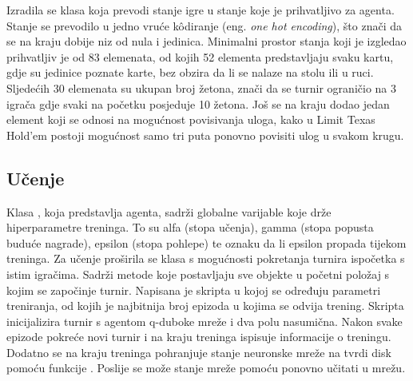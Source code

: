 Izradila se klasa koja prevodi stanje igre u stanje koje je prihvatljivo za agenta. Stanje se prevodilo u jedno vruće k\^odiranje (eng. \textit{one hot encoding}), što znači da se na kraju dobije niz od nula i jedinica.  Minimalni prostor stanja koji je izgledao prihvatljiv je od 83 elemenata, od kojih 52 elementa predstavljaju svaku kartu, gdje su jedinice poznate karte, bez obzira da li se nalaze na stolu ili u ruci. Sljedećih 30 elemenata su ukupan broj žetona, znači da se turnir ograničio na 3 igrača gdje svaki na početku posjeduje 10 žetona. Još se na kraju dodao jedan element koji se odnosi na mogućnost povisivanja uloga, kako u Limit Texas Hold'em postoji mogućnost samo tri puta ponovno povisiti ulog u svakom krugu.

\subsection{Učenje}
Klasa , koja predstavlja agenta, sadrži globalne varijable koje drže hiperparametre treninga. To su alfa (stopa učenja), gamma (stopa popusta buduće nagrade), epsilon (stopa pohlepe) te oznaku da li epsilon propada tijekom treninga. Za učenje proširila se klasa  s mogućnosti pokretanja turnira ispočetka s istim igračima. Sadrži metode koje postavljaju sve objekte u početni položaj s kojim se započinje turnir. Napisana je skripta u kojoj se određuju parametri treniranja, od kojih je najbitnija broj epizoda u kojima se odvija trening. Skripta inicijalizira turnir s agentom q-duboke mreže i dva polu nasumična. Nakon svake epizode pokreće novi turnir i na kraju treninga ispisuje informacije o treningu. Dodatno se na kraju treninga pohranjuje stanje neuronske mreže na tvrdi disk pomoću funkcije . Poslije se može stanje mreže pomoću  ponovno učitati u mrežu. 

